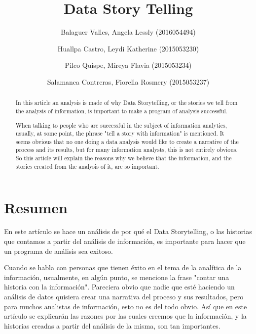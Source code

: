 \documentclass[preprint,12pt]{elsarticle}
\begin{document}
	
	\begin{frontmatter}
		
		
		\title{\huge Data Story Telling}
		
		\author{Balaguer Valles, Angela Lessly               (2016054494)}
		\author{Huallpa Castro, Leydi Katherine	      (2015053230)}
		\author{Pilco Quispe, Mireya Flavia		      (2015053234)}
		\author{Salamanca Contreras, Fiorella Rosmery (2015053237)}
		
		\address{Tacna, Perú}
		
		\begin{abstract}
			In this article an analysis is made of why Data Storytelling, or the stories we tell from the analysis of information, is important to make a program of analysis successful.

When talking to people who are successful in the subject of information analytics, usually, at some point, the phrase "tell a story with information" is mentioned. It seems obvious that no one doing a data analysis would like to create a narrative of the process and its results, but for many information analysts, this is not entirely obvious. So this article will explain the reasons why we believe that the information, and the stories created from the analysis of it, are so important.
	
		\end{abstract}
\end{frontmatter}
	
	\section{Resumen}
		En este artículo se hace un análisis de por qué el Data Storytelling, o las historias que contamos a partir del análisis de información, es importante para hacer que un programa de análisis sea exitoso. 

Cuando se habla con personas que tienen éxito en el tema de la analítica de la información, usualmente, en algún punto, se mencione la frase "contar una historia con la información". Pareciera obvio que nadie que esté haciendo un análisis de datos quisiera crear una narrativa del proceso y sus resultados, pero para muchos analistas de información, esto no es del todo obvio. Así que en este artículo se explicarán las razones por las cuales creemos que la información, y la historias creadas a partir del análisis de la misma, son tan importantes.\\
\end{document}
